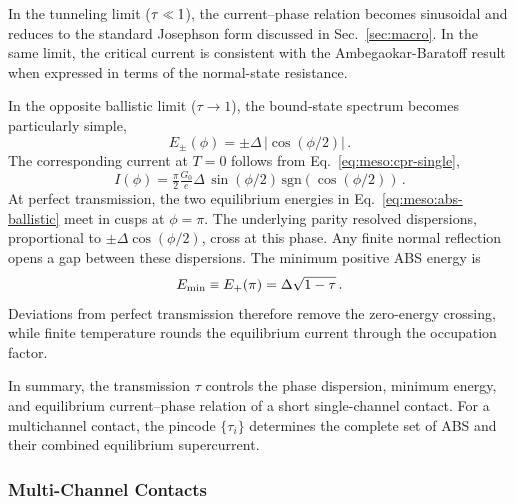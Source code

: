             In the tunneling limit ($\tau\sll 1$), the current--phase relation becomes sinusoidal and reduces to the standard Josephson form discussed in Sec.~\ref{sec:macro}. In the same limit, the critical current is consistent with the Ambegaokar-Baratoff result when expressed in terms of the normal-state resistance.

            In the opposite ballistic limit ($\tau\to 1$), the bound-state spectrum becomes particularly simple,
            \begin{equation}
                E_{\pm}(\phi)=\pm\Delta\,\left|\cos\!\left(\phi/2\right)\right|\,.
                \label{eq:meso:abs-ballistic}
            \end{equation}
            The corresponding current at $T=0$ follows from Eq.~\eqref{eq:meso:cpr-single},
            \begin{equation}
                I(\phi)=\tfrac{\pi}{2}\tfrac{G_0}{e}\Delta\,\sin\!\left(\phi/2\right)\,\mathrm{sgn}\!\left(\cos\!\left(\phi/2\right)\right)\,.
            \end{equation}
            At perfect transmission, the two equilibrium energies in Eq.~\eqref{eq:meso:abs-ballistic} meet in cusps at $\phi=\pi$. The underlying parity resolved dispersions, proportional to $\pm\Delta\cos(\phi/2)$, cross at this phase. Any finite normal reflection opens a gap between these dispersions. The minimum positive ABS energy is
            \begin{equation}
                E_\mathrm{min}\sequiv E_+(\pi)=\Delta\sqrt{1-\tau}\,.
            \end{equation}
            Deviations from perfect transmission therefore remove the zero-energy crossing, while finite temperature rounds the equilibrium current through the occupation factor.

            In summary, the transmission $\tau$ controls the phase dispersion, minimum energy, and equilibrium current--phase relation of a short single-channel contact. For a multichannel contact, the pincode $\{\tau_i\}$ determines the complete set of ABS and their combined equilibrium supercurrent.

        \subsubsection*{Multi-Channel Contacts}

